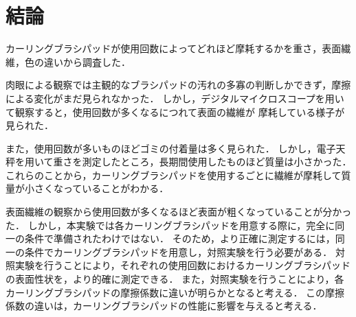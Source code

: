 \documentclass[main]{subfiles}
\begin{document}
\chapter{結論}
カーリングブラシパッドが使用回数によってどれほど摩耗するかを重さ，表面繊維，色の違いから調査した．

肉眼による観察では主観的なブラシパッドの汚れの多寡の判断しかできず，摩擦による変化がまだ見られなかった．
しかし，デジタルマイクロスコープを用いて観察すると，使用回数が多くなるにつれて表面の繊維が
摩耗している様子が見られた．

また，使用回数が多いものほどゴミの付着量は多く見られた．
しかし，電子天秤を用いて重さを測定したところ，長期間使用したものほど質量は小さかった．
これらのことから，カーリングブラシパッドを使用するごとに繊維が摩耗して質量が小さくなっていることがわかる．

表面繊維の観察から使用回数が多くなるほど表面が粗くなっていることが分かった．
しかし，本実験では各カーリングブラシパッドを用意する際に，完全に同一の条件で準備されたわけではない．
そのため，より正確に測定するには，同一の条件でカーリングブラシパッドを用意し，対照実験を行う必要がある．
対照実験を行うことにより，それぞれの使用回数におけるカーリングブラシパッドの表面性状を，より的確に測定できる．
また，対照実験を行うことにより，各カーリングブラシパッドの摩擦係数に違いが明らかとなると考える．
この摩擦係数の違いは，カーリングブラシパッドの性能に影響を与えると考える．
\end{document}
